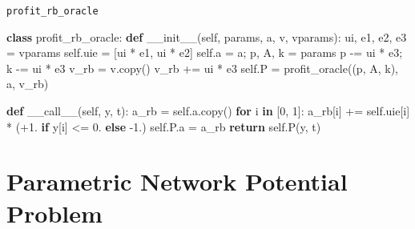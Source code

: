 \documentclass[10pt,ignorenonframetext,serif,onlymath]{beamer}
\newenvironment{Shaded}{}{}
\newcommand{\ControlFlowTok}[1]{\textcolor[rgb]{0.00,0.44,0.13}{\textbf{#1}}}
\newcommand{\DecValTok}[1]{\textcolor[rgb]{0.25,0.63,0.44}{#1}}
\newcommand{\FloatTok}[1]{\textcolor[rgb]{0.25,0.63,0.44}{#1}}
\newcommand{\FunctionTok}[1]{\textcolor[rgb]{0.02,0.16,0.49}{#1}}
\newcommand{\KeywordTok}[1]{\textcolor[rgb]{0.00,0.44,0.13}{\textbf{#1}}}
\newcommand{\NormalTok}[1]{#1}
\newcommand{\OperatorTok}[1]{\textcolor[rgb]{0.40,0.40,0.40}{#1}}
\newcommand{\VariableTok}[1]{\textcolor[rgb]{0.10,0.09,0.49}{#1}}
\begin{document}
\begin{frame}[fragile]{\texttt{profit\_rb\_oracle}}
\protect\hypertarget{profit_rb_oracle}{}

\begin{Shaded}
\begin{Highlighting}[]
\KeywordTok{class}\NormalTok{ profit_rb_oracle:}
    \KeywordTok{def} \FunctionTok{__init__}\NormalTok{(}\VariableTok{self}\NormalTok{, params, a, v, vparams):}
\NormalTok{        ui, e1, e2, e3 }\OperatorTok{=}\NormalTok{ vparams}
        \VariableTok{self}\NormalTok{.uie }\OperatorTok{=}\NormalTok{ [ui }\OperatorTok{*}\NormalTok{ e1, ui }\OperatorTok{*}\NormalTok{ e2]}
        \VariableTok{self}\NormalTok{.a }\OperatorTok{=}\NormalTok{ a}\OperatorTok{;}\NormalTok{ p, A, k }\OperatorTok{=}\NormalTok{ params}
\NormalTok{        p }\OperatorTok{-=}\NormalTok{ ui }\OperatorTok{*}\NormalTok{ e3}\OperatorTok{;}\NormalTok{ k }\OperatorTok{-=}\NormalTok{ ui }\OperatorTok{*}\NormalTok{ e3}
\NormalTok{        v_rb }\OperatorTok{=}\NormalTok{ v.copy()}
\NormalTok{        v_rb }\OperatorTok{+=}\NormalTok{ ui }\OperatorTok{*}\NormalTok{ e3}
        \VariableTok{self}\NormalTok{.P }\OperatorTok{=}\NormalTok{ profit_oracle((p, A, k), a, v_rb)}

    \KeywordTok{def} \FunctionTok{__call__}\NormalTok{(}\VariableTok{self}\NormalTok{, y, t):}
\NormalTok{        a_rb }\OperatorTok{=} \VariableTok{self}\NormalTok{.a.copy()}
        \ControlFlowTok{for}\NormalTok{ i }\KeywordTok{in}\NormalTok{ [}\DecValTok{0}\NormalTok{, }\DecValTok{1}\NormalTok{]:}
\NormalTok{            a_rb[i] }\OperatorTok{+=} \VariableTok{self}\NormalTok{.uie[i] }\OperatorTok{*}\NormalTok{ (}\OperatorTok{+}\FloatTok{1.}
                        \ControlFlowTok{if}\NormalTok{ y[i] }\OperatorTok{<=} \FloatTok{0.} \ControlFlowTok{else} \FloatTok{-1.}\NormalTok{)}
        \VariableTok{self}\NormalTok{.P.a }\OperatorTok{=}\NormalTok{ a_rb}
        \ControlFlowTok{return} \VariableTok{self}\NormalTok{.P(y, t)}
\end{Highlighting}
\end{Shaded}

\end{frame}

\hypertarget{parametric-network-potential-problem}{%
\section{Parametric Network Potential
Problem}\label{parametric-network-potential-problem}}
\end{document}
